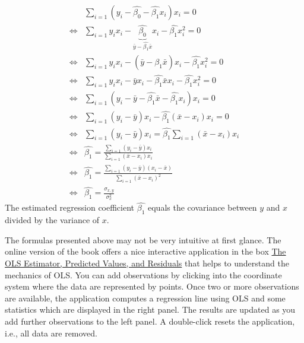 \documentclass[
  12pt,
  oneside]{book}
\theoremstyle{definition}
\theoremstyle{definition}
\theoremstyle{definition}
\theoremstyle{definition}
\theoremstyle{remark}
\begin{document}
\begin{align*}
    &\sum_{i=1} (y_i - \hat{\beta_{0}} - \hat{\beta_{1}} x_i)x_i=0\\
    \Leftrightarrow & \sum_{i=1}    y_i x_i- \underbrace{\hat{\beta_{0}}}_{\bar{y}-\hat{\beta_{1}}\bar{x}}x_i - \hat{\beta_{1}} x_i^2=0\\
    \Leftrightarrow & \sum_{i=1}    y_i x_i- (\bar{y}-\hat{\beta_{1}}\bar{x})x_i - \hat{\beta_{1}} x_i^2=0\\    
    \Leftrightarrow & \sum_{i=1}    y_i x_i- \bar{y}x_i-\hat{\beta_{1}}\bar{x}x_i - \hat{\beta_{1}} x_i^2=0\\   
    \Leftrightarrow & \sum_{i=1}    (y_i - \bar{y}-\hat{\beta_{1}}\bar{x} - \hat{\beta_{1}} x_i)x_i=0\\ 
    \Leftrightarrow & \sum_{i=1} (y_i - \bar{y}) x_i -\hat{\beta_{1}}(\bar{x} -  x_i)x_i =0\\
    \Leftrightarrow & \sum_{i=1}    (y_i - \bar{y}) x_i  =  \hat{\beta_{1}} \sum_{i=1} (\bar{x} -  x_i) x_i \\
    \Leftrightarrow & \hat{\beta_{1}} =\frac{\sum_{i=1}(y_i - \bar{y})x_i }{ \sum_{i=1} (\bar{x} -  x_i)x_i }\\
        \Leftrightarrow & \hat{\beta_{1}} =\frac{\sum_{i=1}(y_i -\bar{y})(x_i-\bar{x})}{\sum_{i=1} (\bar{x} -  x_i)^2 }\\
    \Leftrightarrow & \hat{\beta_{1}} ={\frac {\sigma_{x,y}}{\sigma^2_{x}}}
\end{align*}
The estimated regression coefficient \(\hat{\beta_{1}}\) equals the covariance between \(y\) and \(x\) divided by the variance of \(x\).

The formulas presented above may not be very intuitive at first glance. The online version of the book \citet{Hanck2020Introduction} offers a nice interactive application in the box \href{https://www.econometrics-with-r.org/4-2-estimating-the-coefficients-of-the-linear-regression-model.html}{The OLS Estimator, Predicted Values, and Residuals} that helps to understand the mechanics of OLS. You can add observations by clicking into the coordinate system where the data are represented by points. Once two or more observations are available, the application computes a regression line using OLS and some statistics which are displayed in the right panel. The results are updated as you add further observations to the left panel. A double-click resets the application, i.e., all data are removed.
\end{document}
